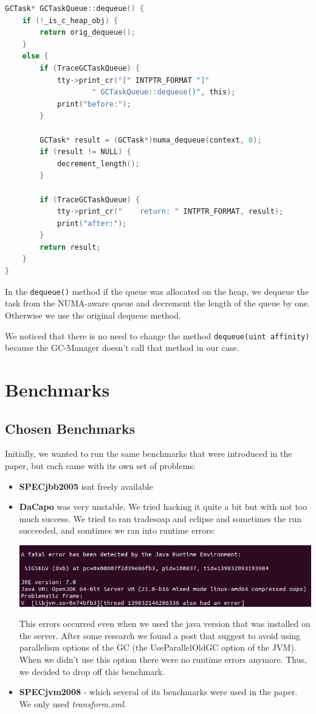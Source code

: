 \documentclass{article}
\begin{document}
 \begin{lstlisting}[language=C]
GCTask* GCTaskQueue::dequeue() {
    if (!_is_c_heap_obj) {
        return orig_dequeue();
    }
    else {
        if (TraceGCTaskQueue) {
            tty->print_cr("[" INTPTR_FORMAT "]"
                    " GCTaskQueue::dequeue()", this);
            print("before:");
        }

        GCTask* result = (GCTask*)numa_dequeue(context, 0);
        if (result != NULL) {
            decrement_length();
        }

        if (TraceGCTaskQueue) {
            tty->print_cr("    return: " INTPTR_FORMAT, result);
            print("after:");
        }
        return result;
    }
}
 \end{lstlisting}

 In the \lstinline{dequeue()} method if the queue was allocated on the heap, we dequeue the task from the NUMA-aware queue and decrement the length of the queue by one. Otherwise we use the original dequeue method.

 We noticed that there is no need to change the method \lstinline{dequeue(uint affinity)} because the GC-Manager doesn't call that method in our case.

 \newpage

 \section{Benchmarks}
 \subsection{Chosen Benchmarks}
 Initially, we wanted to run the same benchmarks that were introduced in the paper, but each came with its own set of problems:

 \begin{itemize}
   \item \textbf{SPECjbb2005} isnt freely available
   \item \textbf{DaCapo} was very unstable. We tried hacking it quite a bit but with not too much success.
       We tried to ran tradesoap and eclipse and sometimes the run succeeded, and somtimes we ran into runtime errors:

 \includegraphics[width=\textwidth]{dacapo_error.png}

         This errors occurred even when we used the java version that was installed on the server.
         After some research we found a post that suggest to avoid using parallelism options of the GC (the UseParallelOldGC option of the JVM). When we didn't use this option there were no runtime errors anymore.
         Thus, we decided to drop off this benchmark.
   \item \textbf{SPECjvm2008} - which several of its benchmarks were used in the paper. We only used \textit{transform.xml}.
 \end{itemize}
\end{document}
